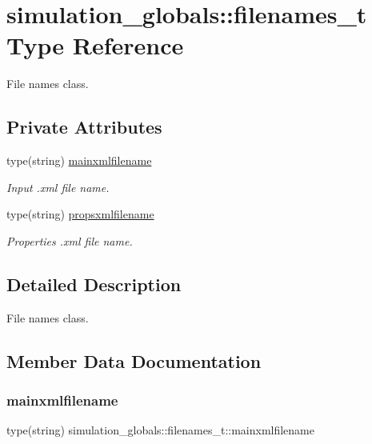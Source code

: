 \hypertarget{structsimulation__globals_1_1filenames__t}{}\section{simulation\+\_\+globals\+:\+:filenames\+\_\+t Type Reference}
\label{structsimulation__globals_1_1filenames__t}


File names class.  


\subsection*{Private Attributes}
\begin{DoxyCompactItemize}
\item 
type(string) \mbox{\hyperlink{structsimulation__globals_1_1filenames__t_aa869049343f7c4d46c36eb056bfd17a5}{mainxmlfilename}}
\begin{DoxyCompactList}\small\item\em Input .xml file name. \end{DoxyCompactList}\item 
type(string) \mbox{\hyperlink{structsimulation__globals_1_1filenames__t_a7574fc21683b726bc0cc9d41bf8f4513}{propsxmlfilename}}
\begin{DoxyCompactList}\small\item\em Properties .xml file name. \end{DoxyCompactList}\end{DoxyCompactItemize}


\subsection{Detailed Description}
File names class. 

\subsection{Member Data Documentation}
\mbox{\label{structsimulation__globals_1_1filenames__t_aa869049343f7c4d46c36eb056bfd17a5}} 
\subsubsection{\texorpdfstring{mainxmlfilename}{mainxmlfilename}}
{\footnotesize\ttfamily type(string) simulation\+\_\+globals\+::filenames\+\_\+t\+::mainxmlfilename\hspace{0.3cm}{\ttfamily [private]}}



